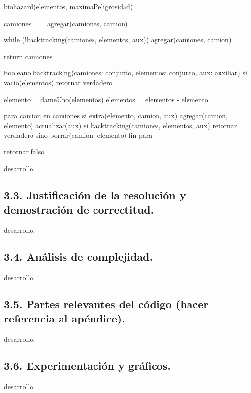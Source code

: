 biohazard(elementos, maximaPeligrosidad) {
  camiones = []
  agregar(camiones, camion)
  
  while (!backtracking(camiones, elementos, aux)) {
    agregar(camiones, camion)
  }
  
  return camiones
}



booleano backtracking(camiones: conjunto, elementos: conjunto, aux: auxiliar)
  si vacio(elementos)
    retornar verdadero
  
  elemento = dameUno(elementos)
  elementos = elementos - elemento
  
  para camion en camiones
    si entra(elemento, camion, aux)
      agregar(camion, elemento)
      actualizar(aux)
      si backtracking(camiones, elementos, aux)
        retornar verdadero
      sino
        borrar(camion, elemento)
  fin para
  
  retornar falso


 
\vspace*{0.3cm}

desarrollo.


\vspace*{0.75cm} \noindent





\subsection{3.3. Justificación de la resolución y demostración de correctitud.}

\vspace*{0.3cm}

desarrollo.


\vspace*{0.75cm} \noindent





\subsection{3.4. Análisis de complejidad.}

\vspace*{0.3cm}

desarrollo.


\vspace*{0.75cm} \noindent





\subsection{3.5. Partes relevantes del código (hacer referencia al apéndice).}

\vspace*{0.3cm}

desarrollo.


\vspace*{0.75cm} \noindent





\subsection{3.6. Experimentación y gráficos.}

\vspace*{0.3cm}

desarrollo.
